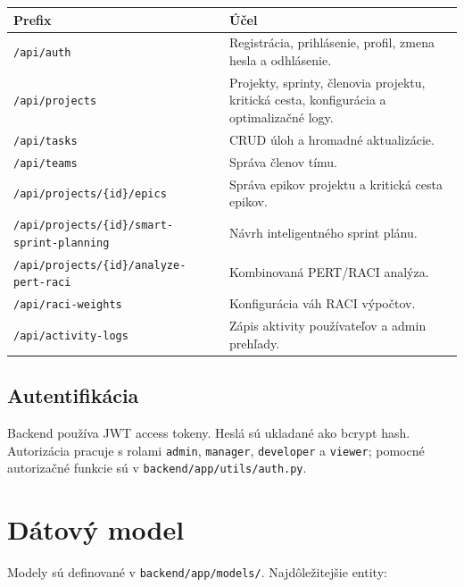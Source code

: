 ﻿\documentclass[12pt,a4paper]{article}
\begin{document}
\begin{longtable}{|p{4.5cm}|p{9cm}|}
\hline
\textbf{Prefix} & \textbf{Účel} \\
\hline
\texttt{/api/auth} & Registrácia, prihlásenie, profil, zmena hesla a odhlásenie. \\
\hline
\texttt{/api/projects} & Projekty, sprinty, členovia projektu, kritická cesta, konfigurácia a optimalizačné logy. \\
\hline
\texttt{/api/tasks} & CRUD úloh a hromadné aktualizácie. \\
\hline
\texttt{/api/teams} & Správa členov tímu. \\
\hline
\texttt{/api/projects/\{id\}/epics} & Správa epikov projektu a kritická cesta epikov. \\
\hline
\texttt{/api/projects/\{id\}/smart-sprint-planning} & Návrh inteligentného sprint plánu. \\
\hline
\texttt{/api/projects/\{id\}/analyze-pert-raci} & Kombinovaná PERT/RACI analýza. \\
\hline
\texttt{/api/raci-weights} & Konfigurácia váh RACI výpočtov. \\
\hline
\texttt{/api/activity-logs} & Zápis aktivity používateľov a admin prehľady. \\
\hline
\end{longtable}

\subsection{Autentifikácia}

Backend používa JWT access tokeny. Heslá sú ukladané ako bcrypt hash. Autorizácia pracuje s rolami \texttt{admin}, \texttt{manager}, \texttt{developer} a \texttt{viewer}; pomocné autorizačné funkcie sú v \texttt{backend/app/utils/auth.py}.

\section{Dátový model}

Modely sú definované v \texttt{backend/app/models/}. Najdôležitejšie entity:
\end{document}
